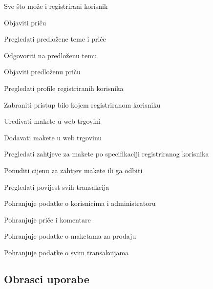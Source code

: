 \begin{packed_enum}
				\begin{packed_enum}
					
					\item Sve što može i registrirani korisnik
					\item Objaviti priču
					\item Pregledati predložene teme i priče
					\item Odgovoriti na predloženu temu
					\item Objaviti predloženu priču
					\item Pregledati profile registriranih korisnika
					\item Zabraniti pristup bilo kojem registriranom korisniku
					\item Uređivati makete u web trgovini
					\item Dodavati makete u web trgovinu
					\item Pregledati zahtjeve za makete po specifikaciji registriranog korisnika
					\item Ponuditi cijenu za zahtjev makete ili ga odbiti
					\item Pregledati povijest svih transakcija
					
				\end{packed_enum}
							\item  {}
		
				\begin{packed_enum}
					
					\item Pohranjuje podatke o korisnicima i administratoru
					\item Pohranjuje priče i komentare
					\item Pohranjuje podatke o maketama za prodaju
					\item Pohranjuje podatke o svim transakcijama
					
				\end{packed_enum}
			\end{packed_enum}
			
			\eject 
			
			
				
			\subsection{Obrasci uporabe}
				
				
			
